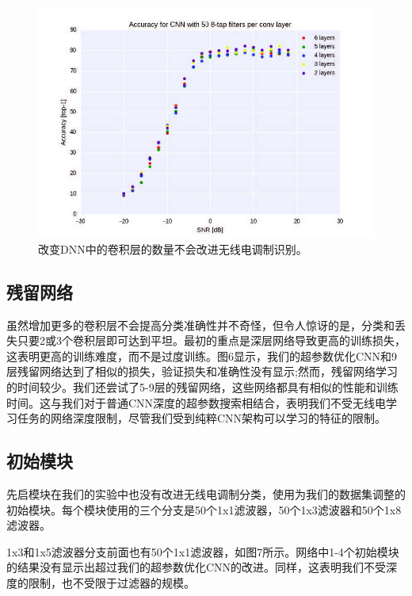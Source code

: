 \begin{figure}[!h]
	\centering
	\includegraphics[scale=1]{figures/chapter_5/fig3}
	\caption{改变DNN中的卷积层的数量不会改进无线电调制识别。}
\end{figure}

\subsection{残留网络}

虽然增加更多的卷积层不会提高分类准确性并不奇怪，但令人惊讶的是，分类和丢失只要2或3个卷积层即可达到平坦。最初的重点是深层网络导致更高的训练损失，这表明更高的训练难度，而不是过度训练。图6显示，我们的超参数优化CNN和9层残留网络达到了相似的损失，验证损失和准确性没有显示;然而，残留网络学习的时间较少。我们还尝试了5-9层的残留网络，这些网络都具有相似的性能和训练时间。这与我们对于普通CNN深度的超参数搜索相结合，表明我们不受无线电学习任务的网络深度限制，尽管我们受到纯粹CNN架构可以学习的特征的限制。\par

\subsection{初始模块}

先启模块在我们的实验中也没有改进无线电调制分类，使用为我们的数据集调整的初始模块。每个模块使用的三个分支是50个1x1滤波器，50个1x3滤波器和50个1x8滤波器。\par
1x3和1x5滤波器分支前面也有50个1x1滤波器，如图7所示。网络中1-4个初始模块的结果没有显示出超过我们的超参数优化CNN的改进。同样，这表明我们不受深度的限制，也不受限于过滤器的规模。\par


